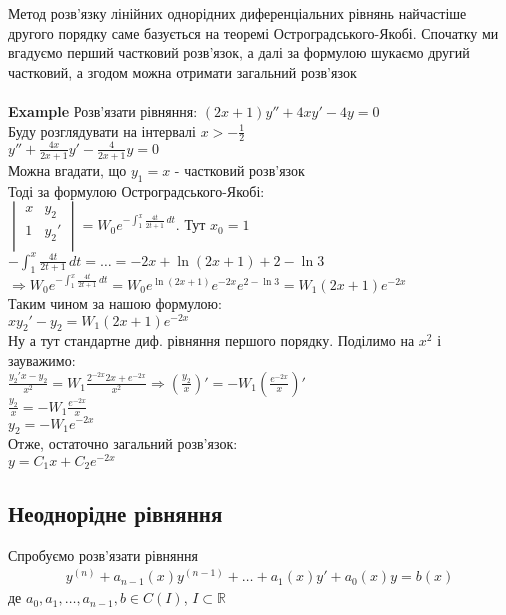 \documentclass[a4paper, 10pt]{article}
\theoremstyle{theoremdd}
\theoremstyle{theoremdd}
\theoremstyle{theoremdd}
\theoremstyle{theoremdd}
\theoremstyle{theoremdd}
\theoremstyle{theoremdd}
\theoremstyle{theoremdd}
\theoremstyle{theoremdd}
\begin{document}
Метод розв'язку лінійних однорідних диференціальних рівнянь найчастіше другого порядку саме базується на теоремі Остроградського-Якобі. Спочатку ми вгадуємо перший частковий розв'язок, а далі за формулою шукаємо другий частковий, а згодом можна отримати загальний розв'язок
\\
\\
\textbf{Example} Розв'язати рівняння: $(2x+1)y'' + 4xy' - 4y = 0$\\
Буду розглядувати на інтервалі $\displaystyle x>-\frac{1}{2}$\\
$\displaystyle y'' + \frac{4x}{2x+1}y' - \frac{4}{2x+1}y = 0$\\
Можна вгадати, що $y_1 = x$ - частковий розв'язок\\
Тоді за формулою Остроградського-Якобі:\\
$\displaystyle \begin{vmatrix}
x & y_2 \\
1 & y_2' \\
\end{vmatrix}
= W_0 e^{-\int_{1}^x \frac{4t}{2t+1}\,dt}$. Тут $x_0 = 1$\\
$\displaystyle -\int_{1}^x \frac{4t}{2t+1}\,dt = \dots = -2x + \ln(2x+1) + 2 - \ln3$\\
$\Rightarrow W_0 e^{-\int_{1}^x \frac{4t}{2t+1}\,dt} = W_0 e^{\ln(2x+1)} e^{-2x} e^{2 - \ln3} = W_1(2x+1)e^{-2x}$\\
Таким чином за нашою формулою:\\
$xy_2'-y_2=W_1(2x+1)e^{-2x}$\\
Ну а тут стандартне диф. рівняння першого порядку. Поділимо на $x^2$ і зауважимо:\\
$\displaystyle \frac{y_2'x-y_2}{x^2} = W_1 \frac{2^{-2x}2x + e^{-2x}}{x^2} \Rightarrow \left(\frac{y_2}{x}\right)' = -W_1 \left( \frac{e^{-2x}}{x} \right)'$\\
$\displaystyle \frac{y_2}{x} = -W_1 \frac{e^{-2x}}{x}$\\
$y_2 = -W_1e^{-2x}$\\
Отже, остаточно загальний розв'язок:\\
$y = C_1x + C_2e^{-2x}$
\bigskip \\

\subsection{Неоднорідне рівняння}
Спробуємо розв'язати рівняння
\begin{align*}
y^{(n)} + a_{n-1}(x)y^{(n-1)}+\dots+a_1(x)y'+a_0(x)y = b(x)
\end{align*}
де $a_0, a_1,\dots,a_{n-1}, b\in C(I)$, $I \subset \mathbb{R}$
\end{document}
